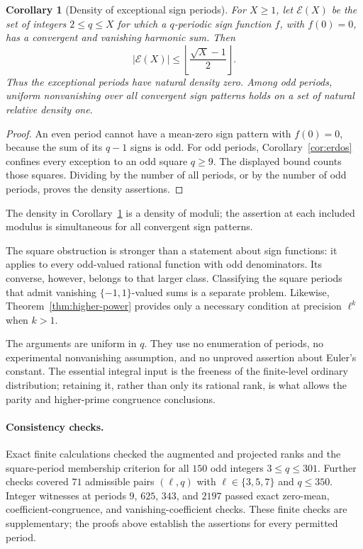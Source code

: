 \documentclass[11pt,a4paper]{article}
\newtheorem{corollary}[theorem]{Corollary}
\theoremstyle{definition}
\theoremstyle{remark}
\begin{document}
\begin{corollary}[Density of exceptional sign periods]\label{cor:density}
For $X\ge1$, let $\mathcal E(X)$ be the set of integers $2\le q\le X$
for which a $q$-periodic sign function $f$, with $f(0)=0$, has a
convergent and vanishing harmonic sum. Then
\[
 |\mathcal E(X)|\le
 \left\lfloor\frac{\sqrt X-1}{2}\right\rfloor.
\]
Thus the exceptional periods have natural density zero. Among odd
periods, uniform nonvanishing over all convergent sign patterns holds
on a set of natural relative density one.
\end{corollary}

\begin{proof}
An even period cannot have a mean-zero sign pattern with $f(0)=0$,
because the sum of its $q-1$ signs is odd. For odd periods,
Corollary~\ref{cor:erdos} confines every exception to an odd square
$q\ge9$. The displayed bound counts those squares. Dividing by the
number of all periods, or by the number of odd periods, proves the
density assertions.
\end{proof}

The density in Corollary~\ref{cor:density} is a density of moduli; the
assertion at each included modulus is simultaneous for all convergent
sign patterns.

The square obstruction is stronger than a statement about sign
functions: it applies to every odd-valued rational function with
odd denominators. Its converse, however, belongs to that larger
class. Classifying the square periods that admit vanishing
$\{-1,1\}$-valued sums is a separate problem. Likewise,
Theorem~\ref{thm:higher-power} provides only a necessary condition
at precision $\ell^k$ when $k>1$.

The arguments are uniform in $q$. They use no enumeration of periods,
no experimental nonvanishing assumption, and no unproved assertion
about Euler's constant. The essential integral input is the freeness
of the finite-level ordinary distribution; retaining it, rather than
only its rational rank, is what allows the parity and higher-prime
congruence conclusions.

\paragraph{Consistency checks.}
Exact finite calculations checked the augmented and projected ranks
and the square-period membership criterion for all $150$ odd integers
$3\le q\le301$. Further checks covered $71$ admissible pairs
$(\ell,q)$ with $\ell\in\{3,5,7\}$ and $q\le350$. Integer witnesses
at periods $9$, $625$, $343$, and $2197$ passed exact zero-mean,
coefficient-congruence, and vanishing-coefficient checks. These finite
checks are supplementary; the proofs above establish the assertions
for every permitted period.
\end{document}
